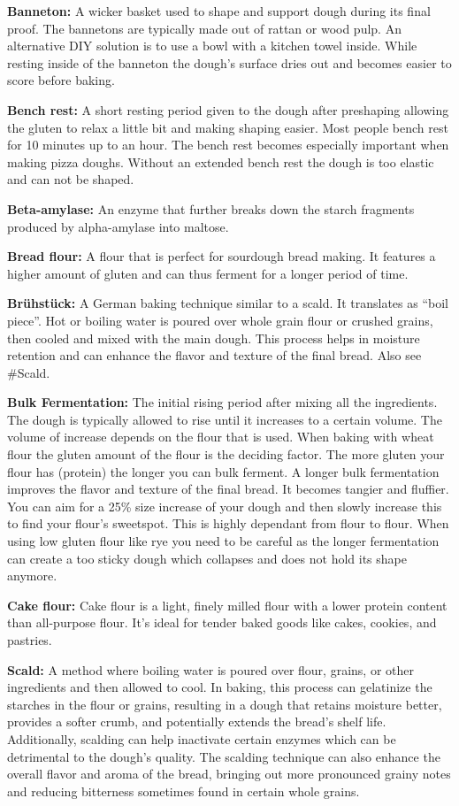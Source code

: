 \textbf{Banneton:} A wicker basket used to shape and support dough during its final
proof. The bannetons are typically made out of rattan or wood pulp. An alternative
DIY solution is to use a bowl with a kitchen towel inside. While resting inside of
the banneton the dough’s surface dries out and becomes easier to score before baking.

\textbf{Bench rest:} A short resting period given to the dough after preshaping
allowing the gluten to relax a little bit and making shaping easier. Most people
bench rest for 10 minutes up to an hour. The bench rest becomes especially important
when making pizza doughs. Without an extended bench rest the dough is too elastic and
can not be shaped.

\textbf{Beta-amylase:} An enzyme that further breaks down the starch fragments
produced by alpha-amylase into maltose.

\textbf{Bread flour:} A flour that is perfect for sourdough bread making. It features
a higher amount of gluten and can thus ferment for a longer period of time.

\textbf{Brühstück:} A German baking technique similar to a scald. It translates as
``boil piece''. Hot or boiling water is poured over whole grain flour or crushed grains,
then cooled and mixed with the main dough. This process helps in moisture retention
and can enhance the flavor and texture of the final bread. Also see \#Scald.

\textbf{Bulk Fermentation:} The initial rising period after mixing all the ingredients.
The dough is typically allowed to rise until it increases to a certain volume. The
volume of increase depends on the flour that is used. When baking with wheat flour
the gluten amount of the flour is the deciding factor. The more gluten your flour has
(protein) the longer you can bulk ferment. A longer bulk fermentation improves the
flavor and texture of the final bread. It becomes tangier and fluffier. You can aim
for a 25\% size increase of your dough and then slowly increase this to find your
flour’s sweetspot. This is highly dependant from flour to flour. When using low gluten
flour like rye you need to be careful as the longer fermentation can create a too
sticky dough which collapses and does not hold its shape anymore.

\textbf{Cake flour:} Cake flour is a light, finely milled flour with a lower protein
content than all-purpose flour. It's ideal for tender baked goods like cakes, cookies,
and pastries.

\textbf{Scald:} A method where boiling water is poured over flour, grains, or other
ingredients and then allowed to cool. In baking, this process can gelatinize the
starches in the flour or grains, resulting in a dough that retains moisture better,
provides a softer crumb, and potentially extends the bread's shelf life. Additionally,
scalding can help inactivate certain enzymes which can be detrimental to the dough's
quality. The scalding technique can also enhance the overall flavor and aroma of
the bread, bringing out more pronounced grainy notes and reducing bitterness
sometimes found in certain whole grains.

